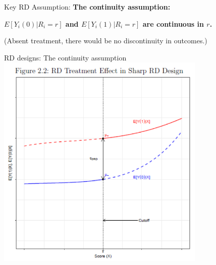 \documentclass[
  ignorenonframetext,
]{beamer}
\begin{document}
\begin{frame}{Key RD Assumption:}
\protect\hypertarget{key-rd-assumption}{}
\textbf{The continuity assumption:}

\textbf{$E[Y_i(0)|R_i=r]$ and $E[Y_i(1)|R_i=r]$ are continuous in $r$.}

\bigskip

(Absent treatment, there would be no discontinuity in outcomes.)
\end{frame}

\begin{frame}{RD designs: The continuity assumption}
\protect\hypertarget{rd-designs-the-continuity-assumption}{}
\includegraphics[width=0.75\textwidth,height=\textheight]{"images/sharpRD2.png"}
\end{frame}
\end{document}

